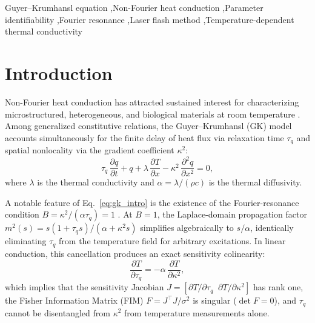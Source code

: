 \documentclass[preprint,12pt,a4paper]{elsarticle}
\begin{document}
\begin{frontmatter}
\begin{abstract}
laser pulse fluence thus provides an inherent physical mechanism to separate relaxation from nonlocality in heat pulse experiments.
\end{abstract}

\begin{keyword}
Guyer--Krumhansl equation \sep Non-Fourier heat conduction \sep Parameter identifiability \sep Fourier resonance \sep Laser flash method \sep Temperature-dependent thermal conductivity
\end{keyword}

\end{frontmatter}

\section{Introduction}
Non-Fourier heat conduction has attracted sustained interest for characterizing microstructured, heterogeneous, and biological materials at room temperature \cite{Van2017,FeherKovacs2021,Grof2018}. Among generalized constitutive relations, the Guyer--Krumhansl (GK) model \cite{GuyerKrumhansl1966a,GuyerKrumhansl1966b} accounts simultaneously for the finite delay of heat flux via relaxation time $\tau_q$ and spatial nonlocality via the gradient coefficient $\kappa^2$:
\begin{equation}
  \tau_q \, \frac{\partial q}{\partial t} + q + \lambda \, \frac{\partial T}{\partial x} - \kappa^2 \, \frac{\partial^2 q}{\partial x^2} = 0 ,
  \label{eq:gk_intro}
\end{equation}
where $\lambda$ is the thermal conductivity and $\alpha = \lambda/(\rho c)$ is the thermal diffusivity.

A notable feature of Eq.~\eqref{eq:gk_intro} is the existence of the Fourier-resonance condition $B = \kappa^2/(\alpha \tau_q) = 1$ \cite{Kovacs2018}. At $B = 1$, the Laplace-domain propagation factor $m^2(s) = s(1+\tau_q s)/(\alpha + \kappa^2 s)$ simplifies algebraically to $s/\alpha$, identically eliminating $\tau_q$ from the temperature field for arbitrary excitations. In linear conduction, this cancellation produces an exact sensitivity colinearity:
\begin{equation}
  \frac{\partial T}{\partial \tau_q} = -\alpha \, \frac{\partial T}{\partial \kappa^2} ,
  \label{eq:identity}
\end{equation}
which implies that the sensitivity Jacobian $J = [\partial T/\partial \tau_q \;\; \partial T/\partial \kappa^2]$ has rank one, the Fisher Information Matrix (FIM) $F = J^\top J / \sigma^2$ is singular ($\det F = 0$), and $\tau_q$ cannot be disentangled from $\kappa^2$ from temperature measurements alone.
\end{document}

